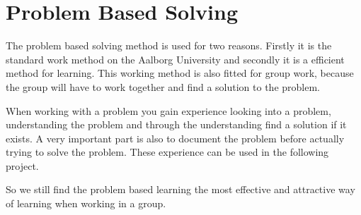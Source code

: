 \section{Problem Based Solving}
The problem based solving method is used for two reasons. Firstly it is the standard work method on the Aalborg University and secondly it is a efficient method for learning.
This working method is also fitted for group work, because the group will have to work together and find a solution to the problem.

When working with a problem you gain experience looking into a problem, understanding the problem and through the understanding find a solution if it exists. A very important part is also to document the problem before actually trying to solve the problem.
These experience can be used in the following project.

So we still find the problem based learning the most effective and attractive way of learning when working in a group.